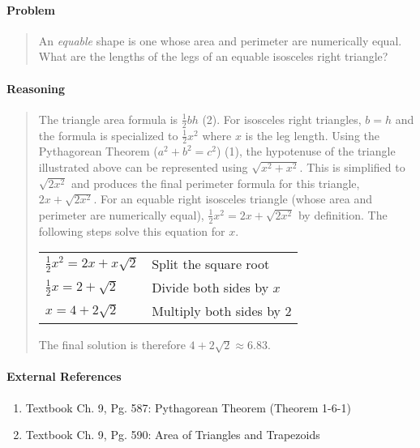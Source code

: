 \documentclass[letterpaper,12pt,twoside]{report}
\begin{document}
	\pagestyle{fancy}
	\fancyhf{}
	
	\paragraph{Problem}
	\begin{quote}
	\textsf{An \textit{equable} shape is one whose area and perimeter are numerically equal. What are the lengths of the legs of an equable isosceles right triangle?}
	\end{quote}
	
	\begin{center}
	\end{center}
	
	\paragraph{Reasoning}
	\begin{quotation}
	
	The triangle area formula is $\frac{1}{2}bh$ (2). For isosceles right triangles, $b=h$ and the formula is specialized to $\frac{1}{2}x^2$ where $x$ is the leg length. Using the Pythagorean Theorem ($a^2+b^2=c^2$) (1), the hypotenuse of the triangle illustrated above can be represented using $\sqrt{x^2+x^2}$. This is simplified to $\sqrt{2x^2}$ and produces the final perimeter formula for this triangle, $2x+\sqrt{2x^2}$. For an equable right isosceles triangle (whose area and perimeter are numerically equal), $\frac{1}{2}x^2 = 2x+\sqrt{2x^2}$ by definition. The following steps solve this equation for $x$.
	
	\begin{center}
		\begin{tabular}{l | l}
			$\frac{1}{2}x^2 = 2x+x\sqrt{2}$ & Split the square root \\
			$\frac{1}{2}x = 2+\sqrt{2}$ & Divide both sides by $x$ \\
			$x = 4+2\sqrt{2}$ & Multiply both sides by 2
		\end{tabular}
	\end{center}

	The final solution is therefore $\boxed{4+2\sqrt{2} \approx 6.83}$.
	
	\end{quotation}
	
	\paragraph{External References}
	
	\begin{enumerate}
		\item Textbook Ch. 9, Pg. 587: Pythagorean Theorem (Theorem 1-6-1)
		\item Textbook Ch. 9, Pg. 590: Area of Triangles and Trapezoids
	\end{enumerate}
\end{document}
